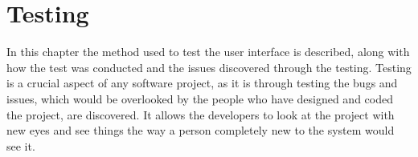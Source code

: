 \chapter{Testing}

In this chapter the method used to test the user interface is described, along with how the test was conducted and the issues discovered through the testing. Testing is a crucial aspect of any software project, as it is through testing the bugs and issues, which would be overlooked by the people who have designed and coded the project, are discovered. It allows the developers to look at the project with new eyes and see things the way a person completely new to the system would see it.
\clearpage


